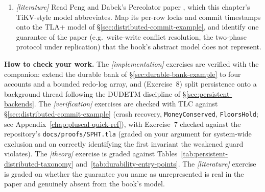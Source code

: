\begin{enumerate}
    \item \emph{[literature]} Read Peng and Dabek's Percolator paper
          \cite{peng10percolator}, which this chapter's TiKV-style model
          abbreviates.  Map its per-row locks and commit timestamps onto
          the TLA+ model of \S\ref{sec:distributed-commit-example}, and
          identify one guarantee of the paper (e.g.\ write-write
          conflict resolution, the two-phase protocol under replication)
          that the book's abstract model does not represent.
\end{enumerate}

\textbf{How to check your work.} The \emph{[implementation]} exercises are
verified with the companion: extend the durable bank of
\S\ref{sec:durable-bank-example} to four accounts and a bounded redo-log
array, and (Exercise~8) split persistence onto a background thread following
the DUDETM discipline of \S\ref{sec:persistent-backends}.  The
\emph{[verification]} exercises are checked with TLC against
\S\ref{sec:distributed-commit-example} (crash recovery,
\texttt{MoneyConserved}, \texttt{FloorsHold}; see
Appendix~\ref{chap:pluscal-quick-ref}), with Exercise~7 checked against the
repository's \texttt{docs/proofs/SPHT.tla} (graded on your argument for
system-wide exclusion and on correctly identifying the first invariant the
weakened guard violates).
The \emph{[theory]} exercise is graded against
Tables~\ref{tab:persistent-distributed-taxonomy}
and~\ref{tab:durability-entry-points}.  The \emph{[literature]} exercise is
graded on whether the guarantee you name as unrepresented is real in the
paper and genuinely absent from the book's model.


